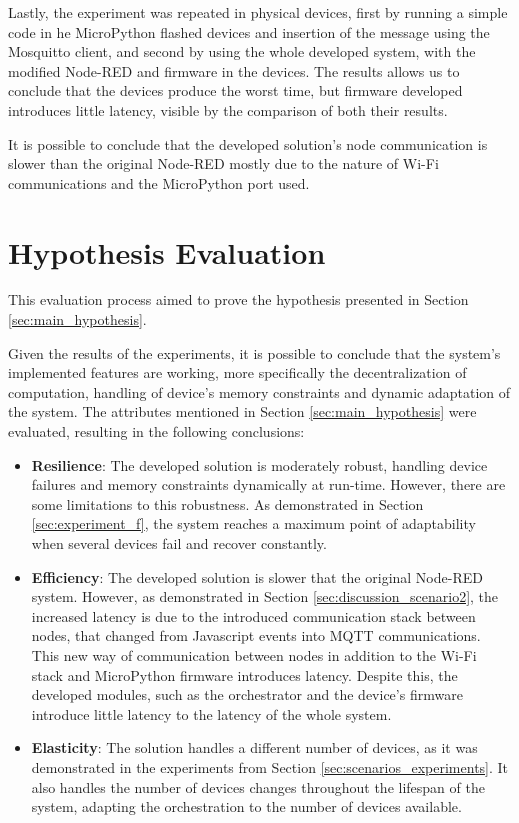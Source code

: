 Lastly, the experiment was repeated in physical devices, first by running a simple code in he MicroPython flashed devices and insertion of the message using the Mosquitto client, and second by using the whole developed system, with the modified Node-RED and firmware in the devices. The results allows us to conclude that the devices produce the worst time, but firmware developed introduces little latency, visible by the comparison of both their results.

It is possible to conclude that the developed solution's node communication is slower than the original Node-RED mostly due to the nature of Wi-Fi communications and the MicroPython port used.   

\section{Hypothesis Evaluation}\label{sec:evaluation_hypothesis}

This evaluation process aimed to prove the hypothesis presented in Section \ref{sec:main_hypothesis}.

Given the results of the experiments, it is possible to conclude that the system's implemented features are working, more specifically the decentralization of computation, handling of device's memory constraints and dynamic adaptation of the system. The attributes mentioned in Section \ref{sec:main_hypothesis} were evaluated, resulting in the following conclusions:

\begin{itemize}
    \item \textbf{Resilience}: The developed solution is moderately robust, handling device failures and memory constraints dynamically at run-time. However, there are some limitations to this robustness. As demonstrated in Section \ref{sec:experiment_f}, the system reaches a maximum point of adaptability when several devices fail and recover constantly.
    \item \textbf{Efficiency}: The developed solution is slower that the original Node-RED system. However, as demonstrated in Section \ref{sec:discussion_scenario2}, the increased latency is due to the introduced communication stack between nodes, that changed from Javascript events into MQTT communications. This new way of communication between nodes in addition to the Wi-Fi stack and MicroPython firmware introduces latency. Despite this, the developed modules, such as the orchestrator and the device's firmware introduce little latency to the latency of the whole system.
    \item \textbf{Elasticity}: The solution handles a different number of devices, as it was demonstrated in the experiments from Section \ref{sec:scenarios_experiments}. It also handles the number of devices changes throughout the lifespan of the system, adapting the orchestration to the number of devices available.
\end{itemize}

